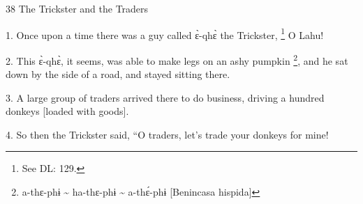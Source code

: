 
38 The Trickster and the Traders

1. Once upon a time there was a guy called ɛ̀-qhɛ̀ the Trickster, \footnote{See DL: 129.} O Lahu!

2. This ɛ̀-qhɛ̀, it seems, was able to make legs on an ashy pumpkin \footnote{a-thɛ-phɨ \textasciitilde{} ha-thɛ-phɨ \textasciitilde{} a-thɛ́-phɨ [Benincasa hispida]}, and
he sat down by the side of a road, and stayed sitting there.

3. A large group of traders arrived there to do business, driving a hundred donkeys
[loaded with goods].

4. So then the Trickster said, ``O traders, let's trade your donkeys for mine!
